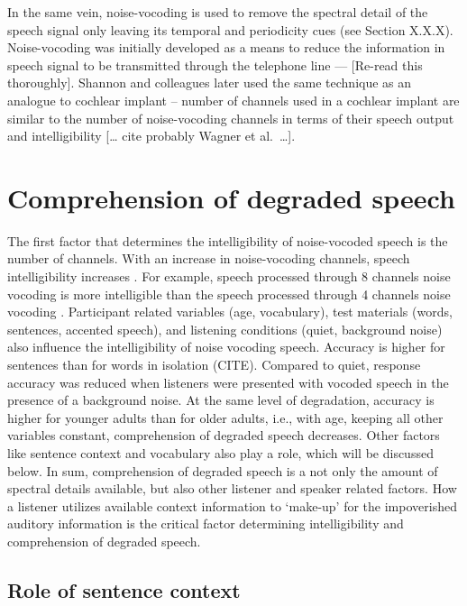 \documentclass[a4paper, nobind]{templates/ociamthesis}
\begin{document}
In the same vein, noise-vocoding is used to remove the spectral detail of the speech signal only leaving its temporal and periodicity cues (see Section X.X.X).
Noise-vocoding was initially developed as a means to reduce the information in speech signal to be transmitted through the telephone line \autocite{Dudley1939,Vocoder1940} --- {[}Re-read this thoroughly{]}.
Shannon and colleagues later used the same technique as an analogue to cochlear implant \autocite{Shannon1995,Loizou1999,Shannon2004} -- number of channels used in a cochlear implant are similar to the number of noise-vocoding channels in terms of their speech output and intelligibility {[}\ldots{} cite probably Wagner et al.~\ldots{]}.

\hypertarget{comprehension-of-degraded-speech}{%
\section{Comprehension of degraded speech}\label{comprehension-of-degraded-speech}}

The first factor that determines the intelligibility of noise-vocoded speech is the number of channels.
With an increase in noise-vocoding channels, speech intelligibility increases \autocites[e.g.,][]{Davis2005,Shannon1995}.
For example, speech processed through 8 channels noise vocoding is more intelligible than the speech processed through 4 channels noise vocoding \autocite{Loizou1999}.
Participant related variables (age, vocabulary), test materials (words, sentences, accented speech), and listening conditions (quiet, background noise) also influence the intelligibility of noise vocoding speech.
Accuracy is higher for sentences than for words in isolation (CITE).
Compared to quiet, response accuracy was reduced when listeners were presented with vocoded speech in the presence of a background noise.
At the same level of degradation, accuracy is higher for younger adults than for older adults, i.e., with age, keeping all other variables constant, comprehension of degraded speech decreases.
Other factors like sentence context and vocabulary also play a role, which will be discussed below.
In sum, comprehension of degraded speech is a not only the amount of spectral details available, but also other listener and speaker related factors.
How a listener utilizes available context information to `make-up' for the impoverished auditory information is the critical factor determining intelligibility and comprehension of degraded speech.

\hypertarget{role-of-sentence-context}{%
\subsection{Role of sentence context}\label{role-of-sentence-context}}
\end{document}
